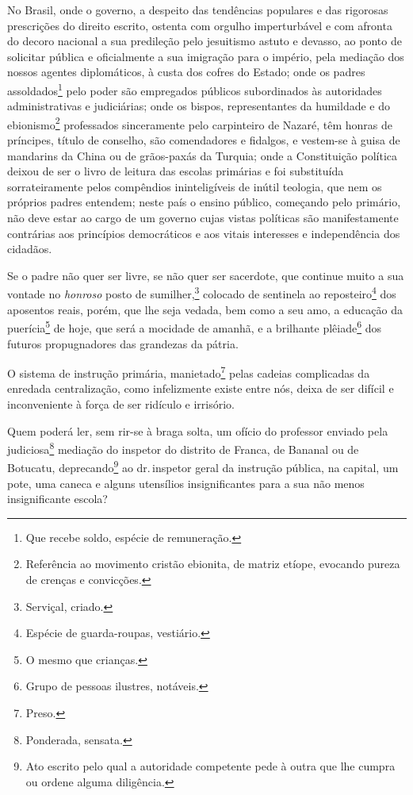 No Brasil, onde o governo, a despeito das tendências populares e das
rigorosas prescrições do direito escrito, ostenta com orgulho
imperturbável e com afronta do decoro nacional a sua predileção pelo
jesuitismo astuto e devasso, ao ponto de solicitar pública e
oficialmente a sua imigração para o império, pela mediação dos nossos
agentes diplomáticos, à custa dos cofres do Estado; onde os padres
assoldados\footnote{Que recebe soldo, espécie de remuneração.} pelo
poder são empregados públicos subordinados às autoridades
administrativas e judiciárias; onde os bispos, representantes da
humildade e do ebionismo\footnote{Referência ao movimento cristão
  ebionita, de matriz etíope, evocando pureza de crenças e convicções.}
professados sinceramente pelo carpinteiro de Nazaré, têm honras de
príncipes, título de conselho, são comendadores e fidalgos, e vestem-se
à guisa de mandarins da China ou de grãos-paxás da Turquia; onde a
Constituição política deixou de ser o livro de leitura das escolas
primárias e foi substituída sorrateiramente pelos compêndios
ininteligíveis de inútil teologia, que nem os próprios padres entendem;
neste país o ensino público, começando pelo primário, não deve estar ao
cargo de um governo cujas vistas políticas são manifestamente contrárias
aos princípios democráticos e aos vitais interesses e independência dos
cidadãos.

Se o padre não quer ser livre, se não quer ser sacerdote, que continue
muito a sua vontade no \emph{honroso} posto de sumilher,\footnote{
  Serviçal, criado.} colocado de sentinela ao reposteiro\footnote{
  Espécie de guarda-roupas, vestiário.} dos aposentos reais, porém, que
lhe seja vedada, bem como a seu amo, a educação da puerícia\footnote{O
  mesmo que crianças.} de hoje, que será a mocidade de amanhã, e a
brilhante plêiade\footnote{Grupo de pessoas ilustres, notáveis.} dos
futuros propugnadores das grandezas da pátria.

O sistema de instrução primária, manietado\footnote{Preso.} pelas
cadeias complicadas da enredada centralização, como infelizmente existe
entre nós, deixa de ser difícil e inconveniente à força de ser ridículo
e irrisório.

Quem poderá ler, sem rir-se à braga solta, um ofício do professor
enviado pela judiciosa\footnote{Ponderada, sensata.} mediação do
inspetor do distrito de Franca, de Bananal ou de Botucatu,
deprecando\footnote{Ato escrito pelo qual a autoridade competente pede
  à outra que lhe cumpra ou ordene alguma diligência.} ao dr.\,inspetor
geral da instrução pública, na capital, um pote, uma caneca e alguns
utensílios insignificantes para a sua não menos insignificante escola?

